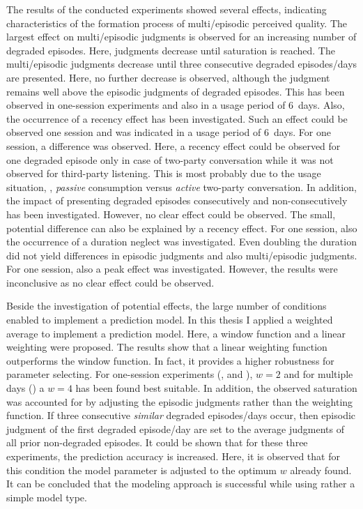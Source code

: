 The results of the conducted experiments showed several effects, indicating characteristics of the formation process of multi\-/episodic perceived quality.
The largest effect on multi\-/episodic judgments is observed for an increasing number of degraded episodes.
Here, judgments decrease until saturation is reached.
The multi\-/episodic judgments decrease until three consecutive degraded episodes/days are presented.
Here, no further decrease is observed, although the judgment remains well above the episodic judgments of degraded episodes.
This has been observed in one-session experiments and also in a usage period of 6~days.
Also, the occurrence of a recency effect has been investigated.
Such an effect could be observed one session and was indicated in a usage period of 6~days.
For one session, a difference was observed.
Here, a recency effect could be observed for one degraded episode only in case of two-party conversation while it was not observed for third-party listening.
This is most probably due to the usage situation, \ie, \emph{passive} consumption versus \emph{active} two-party conversation.
In addition, the impact of presenting degraded episodes consecutively and non-consecutively has been investigated.
However, no clear effect could be observed.
The small, potential difference can also be explained by a recency effect.
For one session, also the occurrence of a duration neglect was investigated.
Even doubling the duration did not yield differences in episodic judgments and also multi\-/episodic judgments.
For one session, also a peak effect was investigated.
However, the results were inconclusive as no clear effect could be observed.

Beside the investigation of potential effects, the large number of conditions enabled to implement a prediction model.
In this thesis I applied a weighted average to implement a prediction model.
Here, a window function and a linear weighting were proposed.
The results show that a linear weighting function outperforms the window function.
In fact, it provides a higher robustness for parameter selecting.
For one-session experiments (, and \EIIa{}), $\mathit{w}=2$ and for multiple days () a $\mathit{w}=4$ has been found best suitable.
In addition, the observed saturation was accounted for by adjusting the episodic judgments rather than the weighting function.
If three consecutive \emph{similar} degraded episodes/days occur, then episodic judgment of the first degraded episode/day are set to the average judgments of all prior non-degraded episodes.
It could be shown that for these three experiments, the prediction accuracy is increased.
Here, it is observed that for this condition the model parameter is adjusted to the optimum $\mathit{w}$ already found.
It can be concluded that the modeling approach is successful while using rather a simple model type.


